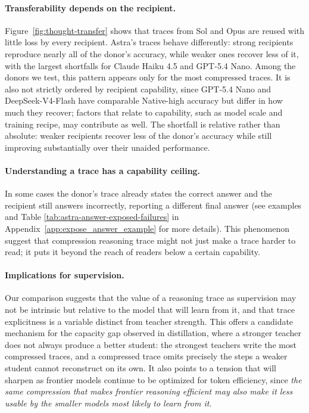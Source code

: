 \documentclass[10pt,letterpaper]{article}
\begin{document}


\paragraph{Transferability depends on the recipient.}
Figure~\ref{fig:thought-transfer} shows that traces from Sol and Opus are reused
with little loss by every recipient. Astra's traces behave differently: strong
recipients reproduce nearly all of the donor's accuracy, while weaker ones recover
less of it, with the largest shortfalls for Claude Haiku 4.5 and GPT-5.4 Nano.
Among the donors we test, this pattern appears only for the most compressed
traces. It is also not strictly ordered by recipient capability, since GPT-5.4
Nano and DeepSeek-V4-Flash have comparable Native-high accuracy but differ in how
much they recover; factors that relate to capability, such as model scale and
training recipe, may contribute as well. The shortfall is relative rather than
absolute: weaker recipients recover less of the donor's accuracy while still
improving substantially over their unaided performance.

\paragraph{Understanding a trace has a capability ceiling.}
In some cases the donor’s trace already states the correct answer and the recipient still answers incorrectly, reporting a different final answer (see examples and Table \ref{tab:astra-answer-exposed-failures} in Appendix~\ref{app:expose_answer_example} for more details). This phenomenon suggest that compression reasoning trace might not just make a trace harder to read; it puts it beyond the reach of readers below a certain capability. 

\paragraph{Implications for supervision.}
Our comparison suggests that the value of a reasoning trace as supervision may not
be intrinsic but relative to the model that will learn from it, and that trace
explicitness is a variable distinct from teacher strength. This offers a candidate
mechanism for the capacity gap observed in distillation, where a stronger teacher
does not always produce a better student: the strongest teachers write the most
compressed traces, and a compressed trace omits precisely the steps a weaker
student cannot reconstruct on its own. It also points to a tension that will
sharpen as frontier models continue to be optimized for token efficiency, since
\emph{the same compression that makes frontier reasoning efficient may also make
it less usable by the smaller models most likely to learn from it}.
\end{document}
